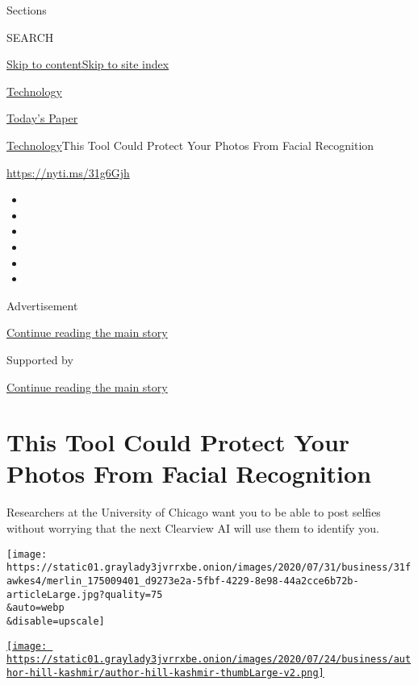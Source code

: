 Sections

SEARCH

\protect\hyperlink{site-content}{Skip to
content}\protect\hyperlink{site-index}{Skip to site index}

\href{https://www.nytimes3xbfgragh.onion/section/technology}{Technology}

\href{https://myaccount.nytimes3xbfgragh.onion/auth/login?response_type=cookie\&client_id=vi}{}

\href{https://www.nytimes3xbfgragh.onion/section/todayspaper}{Today's
Paper}

\href{/section/technology}{Technology}\textbar{}This Tool Could Protect
Your Photos From Facial Recognition

\url{https://nyti.ms/31g6Gjh}

\begin{itemize}
\item
\item
\item
\item
\item
\item
\end{itemize}

Advertisement

\protect\hyperlink{after-top}{Continue reading the main story}

Supported by

\protect\hyperlink{after-sponsor}{Continue reading the main story}

\hypertarget{this-tool-could-protect-your-photos-from-facial-recognition}{%
\section{This Tool Could Protect Your Photos From Facial
Recognition}\label{this-tool-could-protect-your-photos-from-facial-recognition}}

Researchers at the University of Chicago want you to be able to post
selfies without worrying that the next Clearview AI will use them to
identify you.

\texttt{[image: https://static01.graylady3jvrrxbe.onion/images/2020/07/31/business/31fawkes4/merlin\_175009401\_d9273e2a-5fbf-4229-8e98-44a2cce6b72b-articleLarge.jpg?quality=75\\\&auto=webp\\\&disable=upscale]}

\href{https://www.nytimes3xbfgragh.onion/by/kashmir-hill}{\texttt{[image: https://static01.graylady3jvrrxbe.onion/images/2020/07/24/business/author-hill-kashmir/author-hill-kashmir-thumbLarge-v2.png]}}

